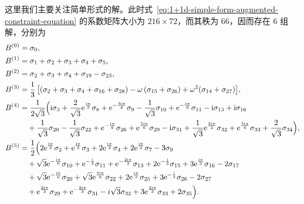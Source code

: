 这里我们主要关注简单形式的解。此时式~\eqref{eq:1+1d-simple-form-augmented-constraint-equation} 的系数矩阵大小为 $216\times72$，而其秩为 66，因而存在 6 组解，分别为
\begin{align}
  B^{(0)} &= \sigma_0, \notag \\
  B^{(1)} &= \sigma_1 + \sigma_2 + \sigma_3 + \sigma_4 + \sigma_5, \notag \\
  B^{(2)} &= \sigma_2 + \sigma_3 + \sigma_4 + \sigma_{19} - \sigma_{23}, \notag \\
  B^{(3)} &= \frac13 \, \bigl[
        (\sigma_2 + \sigma_3 + \sigma_4 + \sigma_{16} + \sigma_{28})
      - \omega \, (\sigma_{15} + \sigma_{26})
      + \omega^2  (\sigma_{14} + \sigma_{27})
    \bigr], \notag \\
  B^{(4)} &= \frac{1}{2\sqrt{3}} \Bigl(
        \mathrm{i} \sigma_3
      + \frac{2}{\sqrt{3}} \mathrm{e}^{\frac{\mathrm{i}\pi}{3}} \sigma_8
      + \mathrm{e}^{-\frac{5 \mathrm{i}\pi}{6}} \sigma_9
      - \frac{1}{\sqrt{3}} \sigma_{10}
      + \mathrm{e}^{-\frac{\mathrm{i}\pi}{6}} \sigma_{11}
      - \mathrm{i} \sigma_{13}
      + \mathrm{i} \sigma_{16} \notag \\
    &\quad {}
      + \frac{1}{\sqrt{3}} \sigma_{20}
      - \frac{1}{\sqrt{3}} \sigma_{22}
      + \mathrm{e}^{-\frac{\mathrm{i}\pi}{6}} \sigma_{26}
      + \mathrm{e}^{\frac{5 \mathrm{i}\pi}{6}} \sigma_{29}
      - \mathrm{i} \sigma_{31}
      + \frac{1}{\sqrt{3}} \mathrm{e}^{\frac{2\mathrm{i}\pi}{3}} \sigma_{32}
      + \mathrm{e}^{\frac{5 \mathrm{i}\pi}{6}} \sigma_{33}
      + \frac{2}{\sqrt{3}} \sigma_{34}
    \Bigr), \notag \\
  B^{(5)} &= \frac12 \Bigl(
        2 \mathrm{e}^{\frac{\mathrm{i}\pi}{3}} \sigma_2
      + \mathrm{e}^{\frac{\mathrm{i}\pi}{3}} \sigma_3
      + 2 \mathrm{e}^{\frac{\mathrm{i}\pi}{3}} \sigma_4
      + 2 \mathrm{e}^{\frac{\mathrm{i}\pi}{3}} \sigma_7
      - 3 \sigma_9 \notag \\
    &\quad {}
      + \sqrt{3} \mathrm{e}^{-\frac{\mathrm{i}\pi}{6}} \sigma_{10}
      + \mathrm{e}^{-\frac{\mathrm{i}}{3}} \sigma_{11}
      + \mathrm{e}^{-\frac{2\mathrm{i}\pi}{3}} \sigma_{13}
      + 2 \mathrm{e}^{-\frac{\mathrm{i}}{3}} \sigma_{15}
      + 3 \mathrm{e}^{\frac{\mathrm{i}\pi}{3}} \sigma_{16}
      - 2 \sigma_{17} \notag \\
    &\quad {}
      + \sqrt{3} \mathrm{e}^{-\frac{\mathrm{i}\pi}{6}} \sigma_{20}
      + \sqrt{3} \mathrm{e}^{\frac{5\mathrm{i}\pi}{6}} \sigma_{22}
      + 2 \mathrm{e}^{\frac{\mathrm{i}\pi}{3}} \sigma_{25}
      + 3 \mathrm{e}^{-\frac{\mathrm{i}}{3}} \sigma_{26}
      - 2 \sigma_{27} \notag \\
    &\quad {}
      + \mathrm{e}^{\frac{2\mathrm{i}\pi}{3}} \sigma_{29}
      + \mathrm{e}^{-\frac{2\mathrm{i}\pi}{3}} \sigma_{31}
      - i \sqrt{3} \sigma_{32}
      + 3 \mathrm{e}^{\frac{2\mathrm{i}\pi}{3}} \sigma_{33}
      + 2 \sigma_{35}
    \Bigr).
\end{align}
